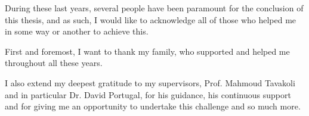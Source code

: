 \vspace{1cm}
\noindent


During these last years, several people have been paramount for the conclusion of this thesis, and as such, I would like to acknowledge all of those who helped me in some way or another to achieve this.

First and foremost, I want to thank my family, who supported and helped me throughout all these years. 

I also extend my deepest gratitude to my supervisors, Prof. Mahmoud Tavakoli and in particular Dr. David Portugal, for his guidance, his continuous support and for giving me an opportunity to undertake this challenge and so much more.